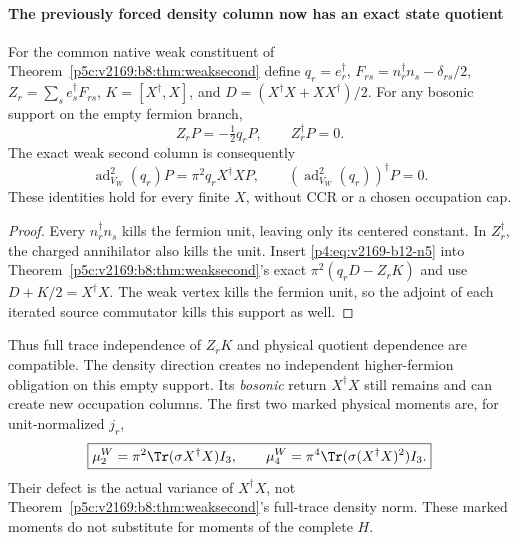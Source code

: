 \documentclass[12pt,a4paper]{article}
\begin{document}
\paragraph{The previously forced density column now has an exact state quotient}
For the common native weak constituent of Theorem~\ref{p5c:v2169:b8:thm:weaksecond} define
$q_r=e_r^\dagger$, $F_{rs}=n_r^\dagger n_s-\delta_{rs}/2$,
$Z_r=\sum_s e_s^\dagger F_{rs}$,
$K=[X^\dagger,X]$, and $D=(X^\dagger X+XX^\dagger)/2$.
For any bosonic support on the empty fermion branch,
\begin{equation}
 \boxed{Z_rP=-\tfrac12q_rP,\qquad Z_r^\dagger P=0.} \label{p4:eq:v2169-b12-n5}
\end{equation}
The exact weak second column is consequently
\begin{equation}
 \boxed{\operatorname{ad}_{V_W}^2(q_r)P
      =\pi^2q_r X^\dagger XP,\qquad
       (\operatorname{ad}_{V_W}^2(q_r))^\dagger P=0.} \label{p4:eq:v2169-b12-n6}
\end{equation}
These identities hold for every finite $X$, without CCR or a chosen
occupation cap.
\begin{proof}
Every $n_r^\dagger n_s$ kills the fermion unit, leaving only its centered
constant. In $Z_r^\dagger$, the charged annihilator also kills the unit.
Insert \eqref{p4:eq:v2169-b12-n5} into Theorem~\ref{p5c:v2169:b8:thm:weaksecond}'s exact
$\pi^2(q_rD-Z_rK)$ and use $D+K/2=X^\dagger X$.
The weak vertex kills the fermion unit, so the adjoint of each iterated
source commutator kills this support as well.
\end{proof}

Thus full trace independence of $Z_rK$ and physical quotient dependence are
compatible. The density direction creates no independent higher-fermion
obligation on this empty support. Its \emph{bosonic} return $X^\dagger X$
still remains and can create new occupation columns.
The first two marked physical moments are, for unit-normalized $j_r$,
\begin{equation}
 \boxed{\mu_2^W=\pi^2\Tr(\sigma X^\dagger X)I_3,\qquad
 \mu_4^W=\pi^4\Tr(\sigma (X^\dagger X)^2)I_3.} \label{p4:eq:v2169-b12-n7}
\end{equation}
Their defect is the actual variance of $X^\dagger X$, not Theorem~\ref{p5c:v2169:b8:thm:weaksecond}'s
full-trace density norm. These marked moments do not substitute for moments
of the complete $H$.
\end{document}
